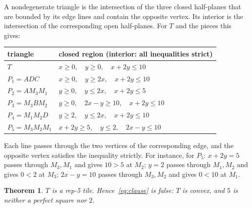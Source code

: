 \documentclass[11pt]{article}
\newtheorem{theorem}{Theorem}
\theoremstyle{definition}
\theoremstyle{remark}
\begin{document}
A nondegenerate triangle is the intersection of the three closed half-planes that are
bounded by its edge lines and contain the opposite vertex. Its interior is the
intersection of the corresponding open half-planes. For $T$ and the pieces this gives:
\begin{center}
\begin{tabular}{ll}
\toprule
triangle & closed region (interior: all inequalities strict)\\
\midrule
$T$ & $x\ge0,\quad y\ge0,\quad x+2y\le10$\\
$P_1=ADC$ & $x\ge0,\quad y\ge2x,\quad x+2y\le10$\\
$P_2=AM_3M_1$ & $y\ge0,\quad y\le2x,\quad x+2y\le5$\\
$P_3=M_3BM_2$ & $y\ge0,\quad 2x-y\ge10,\quad x+2y\le10$\\
$P_4=M_1M_2D$ & $y\ge2,\quad y\le2x,\quad x+2y\le10$\\
$P_5=M_3M_2M_1$ & $x+2y\ge5,\quad y\le2,\quad 2x-y\le10$\\
\bottomrule
\end{tabular}
\end{center}
Each line passes through the two vertices of the corresponding edge, and the opposite
vertex satisfies the inequality strictly. For instance, for $P_5$: $x+2y=5$ passes through
$M_3,M_1$ and gives $10>5$ at $M_2$; $y=2$ passes through $M_1,M_2$ and gives $0<2$ at
$M_3$; $2x-y=10$ passes through $M_3,M_2$ and gives $0<10$ at $M_1$.

\begin{theorem}\label{thm:main}
$T$ is a rep-5 tile. Hence~\eqref{eq:clause} is false: $T$ is convex, and $5$ is neither a
perfect square nor $2$.
\end{theorem}
\end{document}
